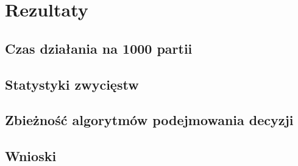 \chapter{Rezultaty}
\label{cha:rozdz5}

\section{Czas działania na 1000 partii}

\section{Statystyki zwycięstw}

\section{Zbieżność algorytmów podejmowania decyzji}

\section{Wnioski}